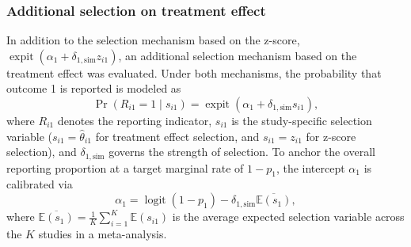 \documentclass[11pt]{article}
\begin{document}
\subsubsection{Additional selection on treatment effect}

In addition to the selection mechanism based on the z-score, $\operatorname{expit}(\alpha_1 + \delta_{1,\mathrm{sim}} z_{i1})$, an additional selection mechanism based on the treatment effect was evaluated. Under both mechanisms, the probability that outcome 1 is reported is modeled as
\begin{equation*}
    \Pr(R_{i1} = 1 \mid s_{i1}) = \operatorname{expit}\left(\alpha_1 + \delta_{1,\mathrm{sim}} s_{i1}\right),
\end{equation*}
where $R_{i1}$ denotes the reporting indicator, $s_{i1}$ is the study-specific selection variable ($s_{i1} = \hat{\theta}_{i1}$ for treatment effect selection, and $s_{i1} = z_{i1}$ for z-score selection), and $\delta_{1,\mathrm{sim}}$ governs the strength of selection.
To anchor the overall reporting proportion at a target marginal rate of $1 - p_1$, the intercept $\alpha_1$ is calibrated via
\begin{equation*}
    \alpha_1 = \operatorname{logit}(1 - p_1) - \delta_{1,\mathrm{sim}} \overline{\mathbb{E}(s_1)},
\end{equation*}
where $\overline{\mathbb{E}(s_1)} = \frac{1}{K} \sum_{i=1}^{K} \mathbb{E}(s_{i1})$ is the average expected selection variable across the $K$ studies in a meta-analysis.
\end{document}
